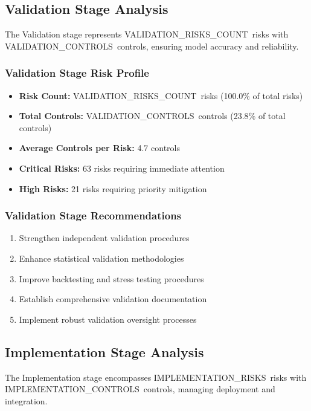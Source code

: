\documentclass[11pt,a4paper]{article}
\newcommand{\validationriskscount}{{{VALIDATION_RISKS_COUNT}}}
\newcommand{\implementationrisks}{{{IMPLEMENTATION_RISKS}}}
\newcommand{\validationcontrols}{{{VALIDATION_CONTROLS}}}
\newcommand{\implementationcontrols}{{{IMPLEMENTATION_CONTROLS}}}
\begin{document}
\subsection{Validation Stage Analysis}

The Validation stage represents \validationriskscount\ risks with \validationcontrols\ controls, ensuring model accuracy and reliability.

\subsubsection{Validation Stage Risk Profile}
\begin{itemize}
\item \textbf{Risk Count:} \validationriskscount\ risks (100.0\% of total risks)
\item \textbf{Total Controls:} \validationcontrols\ controls (23.8\% of total controls)
\item \textbf{Average Controls per Risk:} 4.7 controls
\item \textbf{Critical Risks:} 63 risks requiring immediate attention
\item \textbf{High Risks:} 21 risks requiring priority mitigation
\end{itemize}

\subsubsection{Validation Stage Recommendations}
\begin{enumerate}
\item Strengthen independent validation procedures
\item Enhance statistical validation methodologies
\item Improve backtesting and stress testing procedures
\item Establish comprehensive validation documentation
\item Implement robust validation oversight processes
\end{enumerate}

\subsection{Implementation Stage Analysis}

The Implementation stage encompasses \implementationrisks\ risks with \implementationcontrols\ controls, managing deployment and integration.
\end{document}
